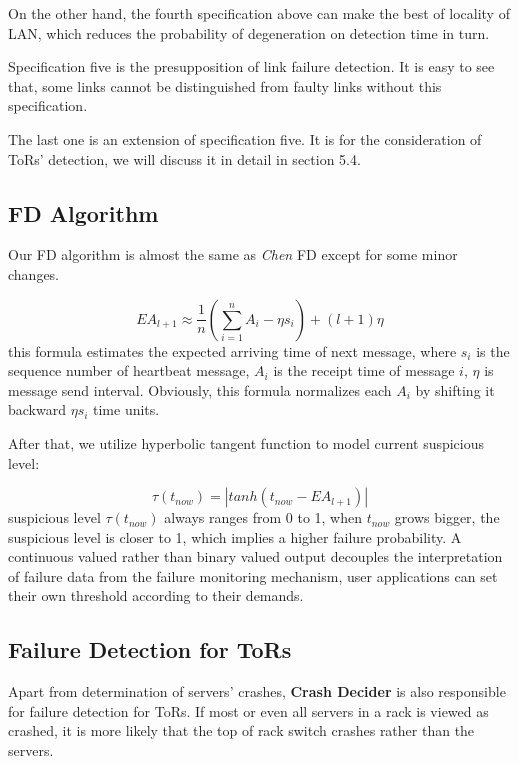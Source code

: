 \documentclass{sig-alternate-05-2015}
\begin{document}
On the other hand, the fourth specification above can make the best of locality of LAN, which reduces the probability of degeneration on detection time in turn.

Specification five is the presupposition of link failure detection. It is easy to see that, some links cannot be distinguished from faulty links without this specification.

The last one is an extension of specification five. It is for the consideration of ToRs' detection, we will discuss it in detail in section 5.4.

\subsection{FD Algorithm}
Our FD algorithm is almost the same as \textit{Chen} FD \cite{chen2002quality} except for some minor changes.

\begin{equation}
EA_{l+1} \approx \frac{1}{n}(\sum_{i=1}^{n}A_i - \eta s_i)+(l+1)\eta
\end{equation}
this formula estimates the expected arriving time of next message, where $s_i$ is the sequence number of heartbeat message, $A_i$ is the receipt time of message $i$, $\eta$ is message send interval. Obviously, this formula normalizes each $A_i$ by shifting it backward $\eta s_i$ time units.

After that, we utilize hyperbolic tangent function to model current suspicious level:

\begin{equation} 
\tau(t_{now}) = |tanh(t_{now}-EA_{l+1})|
\end{equation}
suspicious level $\tau(t_{now})$ always ranges from 0 to 1, when $t_{now}$ grows bigger, the suspicious level is closer to 1, which implies a higher failure probability. A continuous valued rather than binary valued output decouples the interpretation of failure data from the failure monitoring mechanism, user applications can set their own threshold according to their demands.

\subsection{Failure Detection for ToRs}
Apart from determination of servers' crashes, \textbf{Crash Decider} is also responsible for failure detection for ToRs. If most or even all servers in a rack is viewed as crashed, it is more likely that the top of rack switch crashes rather than the servers.
\end{document}
